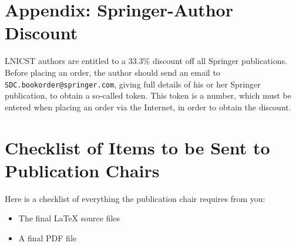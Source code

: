 \documentclass[lnicst,sechang,a4paper]{svmultln}
\begin{document}
\section*{Appendix: Springer-Author Discount}

LNICST authors are entitled to a 33.3\% discount off all Springer
publications. Before placing an order, the author should send an email
to \texttt{SDC.bookorder@springer.com}, giving full
details of his or her
Springer publication, to obtain a so-called token. This token is a
number, which must be entered when placing an order via the Internet, in
order to obtain the discount.

\section{Checklist of Items to be Sent to Publication Chairs}
Here is a checklist of everything the publication chair requires from you:

\setlength{\svitemindent}{8mm}
\begin{itemize}
\itemsep8pt\relax
\renewcommand\labelitemi{{\lower1.5pt\hbox{\Large$\square$}}}

\item The final \LaTeX{} source files
\item A final PDF file
\end{itemize}
\end{document}
